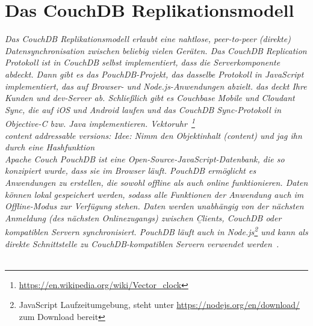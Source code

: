 \section{Das CouchDB Replikationsmodell}
\it{Das CouchDB Replikationsmodell erlaubt eine nahtlose, peer-to-peer (direkte) Datensynchronisation zwischen beliebig vielen Geräten. Das CouchDB Replication Protokoll ist in CouchDB selbst implementiert, dass die Serverkomponente abdeckt. Dann gibt es das PouchDB-Projekt, das dasselbe Protokoll in JavaScript implementiert, das auf Browser- und Node.js-Anwendungen abzielt. das deckt Ihre Kunden und dev-Server ab. Schließlich gibt es Couchbase Mobile und Cloudant Sync, die auf iOS und Android laufen und das CouchDB Sync-Protokoll in Objective-C bzw. Java implementieren.}
%
%
Vektoruhr~\footnote{\url{https://en.wikipedia.org/wiki/Vector_clock}} \\
content addressable versions: Idee: Nimm den Objektinhalt (content) und jag ihn durch eine \gls{Hashfunktion}\\
Apache Couch\tm
%
%
PouchDB ist eine Open-Source-JavaScript-Datenbank, die so konzipiert wurde, dass sie im Browser läuft. PouchDB ermöglicht es Anwendungen zu erstellen, die sowohl offline als auch online funktionieren. Daten können lokal gespeichert werden, sodass alle Funktionen der Anwendung auch im Offline-Modus zur Verfügung stehen.
Daten werden unabhängig von der nächsten Anmeldung (des nächsten Onlinezugangs) zwischen \b{Clients}, CouchDB oder kompatiblen Servern synchronisiert.
PouchDB läuft auch in Node.js\footnote{JavaScript Laufzeitumgebung, steht unter \url{https://nodejs.org/en/download/} zum Download bereit} und kann als direkte Schnittstelle zu CouchDB-kompatiblen Servern verwendet werden~\cite{pouch}.\\\\